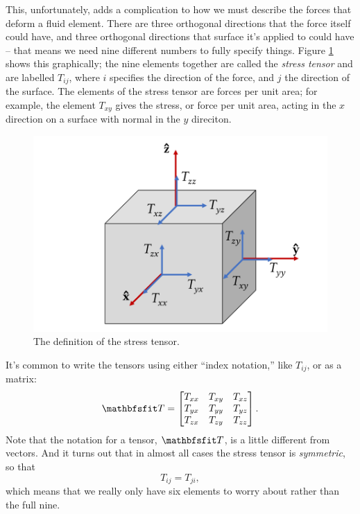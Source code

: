 This, unfortunately, adds a complication to how we must describe the forces that deform a fluid element.  There are three orthogonal directions that the force itself could have, and three orthogonal directions that surface it's applied to could have -- that means we need nine different numbers to fully specify things.  Figure \ref{fig_stress_tensor} shows this graphically; the nine elements together are called the \emph{stress tensor} and are labelled $T_{ij}$, where $i$ specifies the direction of the force, and $j$ the direction of the surface.  The elements of the stress tensor are forces per unit area; for example, the element $T_{xy}$ gives the stress, or force per unit area, acting in the $\unit{x}$ direction on a surface with normal in the $\unit{y}$ direciton.

\begin{figure}
\centering
\includegraphics[width=0.7\linewidth]{Figures/Chapter2/fig_stress_tensor}
\caption{The definition of the stress tensor.}
\label{fig_stress_tensor}
\end{figure}

It's common to write the tensors using either ``index notation,'' like $T_{ij}$, or as a matrix:
\[
\tens{T} = \begin{bmatrix}
T_{xx} & T_{xy} & T_{xz} \\
T_{yx} & T_{yy} & T_{yz} \\
T_{zx} & T_{zy} & T_{zz} 
\end{bmatrix}.
\]
Note that the notation for a tensor, $\tens{T}$, is a little different from vectors.  And it turns out that in almost all cases the stress tensor is \emph{symmetric}, so that 
\[
T_{ij} = T_{ji},
\]
which means that we really only have six elements to worry about rather than the full nine.


